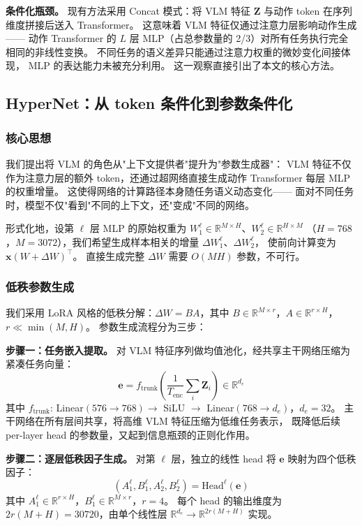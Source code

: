 \documentclass[10pt,twocolumn]{ctexart}
\begin{document}
\textbf{条件化瓶颈。}
现有方法采用 Concat 模式：将 VLM 特征 $\mathbf{Z}$ 与动作 token 在序列维度拼接后送入 Transformer。
这意味着 VLM 特征仅通过注意力层影响动作生成——
动作 Transformer 的 $L$ 层 MLP（占总参数量的 2/3）对所有任务执行完全相同的非线性变换。
不同任务的语义差异只能通过注意力权重的微妙变化间接体现，
MLP 的表达能力未被充分利用。
这一观察直接引出了本文的核心方法。

\subsection{HyperNet：从 token 条件化到参数条件化}\label{sec:hypernet}

\subsubsection{核心思想}

我们提出将 VLM 的角色从"上下文提供者"提升为"参数生成器"：
VLM 特征不仅作为注意力层的额外 token，还通过超网络直接生成动作 Transformer 每层 MLP 的权重增量。
这使得网络的计算路径本身随任务语义动态变化——
面对不同任务时，模型不仅"看到"不同的上下文，还"变成"不同的网络。

形式化地，设第 $\ell$ 层 MLP 的原始权重为 $W_1^\ell \in \mathbb{R}^{M \times H}$、$W_2^\ell \in \mathbb{R}^{H \times M}$
（$H=768$，$M=3072$），我们希望生成样本相关的增量 $\Delta W_1^\ell$、$\Delta W_2^\ell$，
使前向计算变为 $\mathbf{x}(W + \Delta W)^\top$。
直接生成完整 $\Delta W$ 需要 $O(MH)$ 参数，不可行。

\subsubsection{低秩参数生成}

我们采用 LoRA 风格的低秩分解：$\Delta W = BA$，其中 $B \in \mathbb{R}^{M \times r}$，$A \in \mathbb{R}^{r \times H}$，$r \ll \min(M,H)$。
参数生成流程分为三步：

\textbf{步骤一：任务嵌入提取。}
对 VLM 特征序列做均值池化，经共享主干网络压缩为紧凑任务向量：
\begin{equation}
    \mathbf{e} = f_\text{trunk}\!\left(\frac{1}{T_\text{enc}}\sum_i \mathbf{Z}_i\right) \in \mathbb{R}^{d_e}
\end{equation}
其中 $f_\text{trunk}$: Linear$(576 \to 768) \to$ SiLU $\to$ Linear$(768 \to d_e)$，$d_e = 32$。
主干网络在所有层间共享，将高维 VLM 特征压缩为低维任务表示，
既降低后续 per-layer head 的参数量，又起到信息瓶颈的正则化作用。

\textbf{步骤二：逐层低秩因子生成。}
对第 $\ell$ 层，独立的线性 head 将 $\mathbf{e}$ 映射为四个低秩因子：
\begin{equation}
    (A_1^\ell, B_1^\ell, A_2^\ell, B_2^\ell) = \text{Head}^\ell(\mathbf{e})
\end{equation}
其中 $A_1^\ell \in \mathbb{R}^{r \times H}$，$B_1^\ell \in \mathbb{R}^{M \times r}$，$r=4$。
每个 head 的输出维度为 $2r(M+H) = 30720$，由单个线性层 $\mathbb{R}^{d_e} \to \mathbb{R}^{2r(M+H)}$ 实现。
\end{document}
